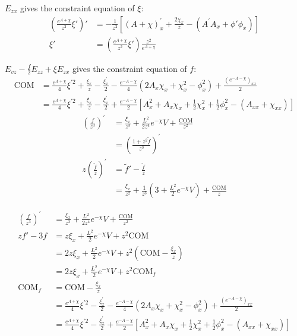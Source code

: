 \documentclass[12pt,a4paper]{ctexart}
\numberwithin{equation}{section}
\begin{document}
$E_{zx}$ gives the constraint equation of $\xi$:
\begin{equation}
    \begin{aligned}
        \left(\frac{e^{A+\chi}}{z^2}\xi'\right)'&=-\frac{1}{z^{2}}[(A+\chi)^{\prime}_{x}+\frac{2\chi_{x}}{z}-(A^{\prime}A_{x}+\phi'\phi_{x})]\\
        \xi'&=\left(\frac{e^{A+\chi}}{z^2}\xi'\right)\frac{z^2}{e^{A+\chi}}
    \end{aligned}
\end{equation}

$E_{vz}-\frac{f}{2}E_{zz}+\xi E_{zx}$ gives the constraint equation of $f$:
\begin{equation}
    \begin{aligned}
        \mathrm{COM}&=\frac{e^{A+\chi}}{4}\xi^{\prime2}+\frac{\xi_{x}}{z}-\frac{\xi_{x}^{\prime}}{2}-\frac{e^{-A-\chi}}{4}(2A_x\chi_x+\chi_{x}^2-\phi_x^2)+\frac{(e^{-A-\chi})_{xx}}{2}\\
        &=\frac{e^{A+\chi}}{4}\xi^{\prime2}+\frac{\xi_{x}}{z}-\frac{\xi_{x}^{\prime}}{2}+\frac{e^{-A-\chi}}{2}[A_x^2+A_x\chi_x+\frac{1}{2}\chi_{x}^2+\frac{1}{2}\phi_x^2-(A_{xx}+\chi_{xx})]
    \end{aligned}
\end{equation}
\begin{equation}
    \begin{aligned}
        (\frac{f}{z^{3}})^{\prime}&=\frac{\xi_{x}}{z^{3}}+\frac{L^{2}}{2z^{4}}e^{-\chi}V+\frac{\mathrm{COM}}{z^{2}}\\
        &=(\frac{1+z^2\tilde{f}}{z^{3}})^{\prime}\\
        z(\frac{\tilde{f}}{z})^{\prime}&=\tilde{f}'-\frac{\tilde
        {f}}{z}\\
        &=\frac{\xi_{x}}{z^2}+\frac{1}{z^3}(3+\frac{L^{2}}{2}e^{-\chi}V)+\frac{\mathrm{COM}}{z}
    \end{aligned}
\end{equation}

\begin{equation}
    \begin{aligned}
        (\frac{f}{z^{3}})^{\prime}&=\frac{\xi_{x}}{z^{3}}+\frac{L^{2}}{2z^{4}}e^{-\chi}V+\frac{\mathrm{COM}}{z^{2}}\\
        zf'-3f&=z\xi_{x}+\frac{L^{2}}{2}e^{-\chi}V+z^2\mathrm{COM}\\
        &=2z\xi_{x}+\frac{L^{2}}{2}e^{-\chi}V+z^2(\mathrm{COM}-\frac{\xi_x}{z})\\
        &=2z\xi_{x}+\frac{L^{2}}{2}e^{-\chi}V+z^2\mathrm{COM}_f\\
        \mathrm{COM}_f&=\mathrm{COM}-\frac{\xi_x}{z}\\
        &=\frac{e^{A+\chi}}{4}\xi^{\prime2}-\frac{\xi_{x}^{\prime}}{2}-\frac{e^{-A-\chi}}{4}(2A_x\chi_x+\chi_{x}^2-\phi_x^2)+\frac{(e^{-A-\chi})_{xx}}{2}\\
        &=\frac{e^{A+\chi}}{4}\xi^{\prime2}-\frac{\xi_{x}^{\prime}}{2}+\frac{e^{-A-\chi}}{2}[A_x^2+A_x\chi_x+\frac{1}{2}\chi_{x}^2+\frac{1}{2}\phi_x^2-(A_{xx}+\chi_{xx})]
    \end{aligned}
\end{equation}
\end{document}

